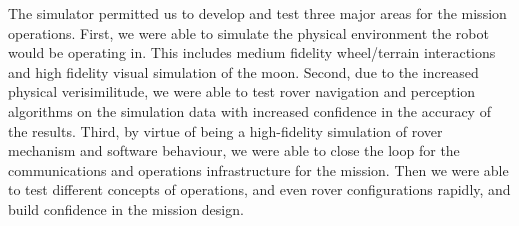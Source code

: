 \documentclass[twocolumn,letterpaper]{IEEEAerospaceCLS}  %
\begin{document}
The simulator permitted us to develop and test three major areas for the mission operations.  
First, we were able to simulate the physical environment the robot would be operating in.  
This includes medium fidelity wheel/terrain interactions and high fidelity visual simulation of the moon.  
Second, due to the increased physical verisimilitude, we were able to test rover navigation and perception algorithms on the simulation data with increased confidence in the accuracy of the results.  
Third, by virtue of being a high-fidelity simulation of rover mechanism and software behaviour, we were able to close the loop for the communications and operations infrastructure for the mission. 
Then we were able to test different concepts of operations, and even rover configurations rapidly, and build confidence in the mission design.




\end{document}
